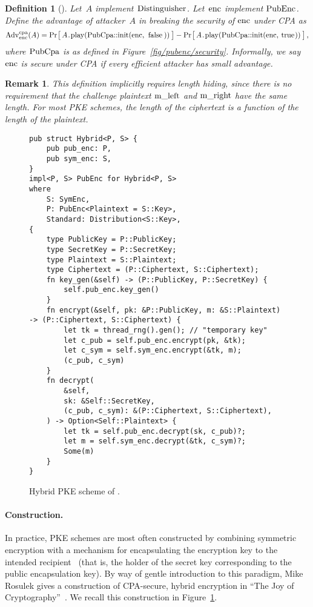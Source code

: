 \documentclass{article}
\newtheorem{definition}{Definition}
\newtheorem{remark}{Remark}
\newcommand{\Adv}[1]{\textrm{\textup{Adv}}^{\textup{#1}}}
\newcommand{\Prob}[1]{\Pr\hspace{-1pt}\big[\,#1\,\big]}
\newcommand{\code}[1]{\textrm{\textup{\lstinline{#1}}}}
\begin{document}
\begin{definition}[{\cite[Definition 15.1]{joy}}]
  Let~$A$ implement \hyperref[sec/traits]{$\code{Distinguisher}$}.
  Let~$\code{enc}$ implement \hyperref[fig/pubenc/syntax]{$\code{PubEnc}$}.
  Define the advantage of attacker~$A$ in breaking the security of
  $\code{enc}$ under CPA as
  \[
    \Adv{cpa}_{\code{enc}}(A) =
      \Prob{A\code{.play(PubCpa::init(enc, false))}} -
      \Prob{A\code{.play(PubCpa::init(enc, true))}} \,,
  \]
  where $\code{PubCpa}$ is as defined in Figure~\ref{fig/pubenc/security}.
  Informally, we say $\code{enc}$ is secure under CPA if every efficient
  attacker has small advantage.
\end{definition}

\begin{remark}
  This definition implicitly requires length hiding, since there is no
  requirement that the challenge plaintext $\code{m_left}$ and $\code{m_right}$
  have the same length. For most PKE schemes, the length of the ciphertext is a
  function of the length of the plaintext.
\end{remark}


\begin{figure}[t]
\begin{lstlisting}
pub struct Hybrid<P, S> {
    pub pub_enc: P,
    pub sym_enc: S,
}
impl<P, S> PubEnc for Hybrid<P, S>
where
    S: SymEnc,
    P: PubEnc<Plaintext = S::Key>,
    Standard: Distribution<S::Key>,
{
    type PublicKey = P::PublicKey;
    type SecretKey = P::SecretKey;
    type Plaintext = S::Plaintext;
    type Ciphertext = (P::Ciphertext, S::Ciphertext);
    fn key_gen(&self) -> (P::PublicKey, P::SecretKey) {
        self.pub_enc.key_gen()
    }
    fn encrypt(&self, pk: &P::PublicKey, m: &S::Plaintext) -> (P::Ciphertext, S::Ciphertext) {
        let tk = thread_rng().gen(); // "temporary key"
        let c_pub = self.pub_enc.encrypt(pk, &tk);
        let c_sym = self.sym_enc.encrypt(&tk, m);
        (c_pub, c_sym)
    }
    fn decrypt(
        &self,
        sk: &Self::SecretKey,
        (c_pub, c_sym): &(P::Ciphertext, S::Ciphertext),
    ) -> Option<Self::Plaintext> {
        let tk = self.pub_enc.decrypt(sk, c_pub)?;
        let m = self.sym_enc.decrypt(&tk, c_sym)?;
        Some(m)
    }
}
\end{lstlisting}
  \caption{Hybrid PKE scheme of \cite[Construction 15.8]{joy}.}
  \label{fig/hybrid}
\end{figure}


\paragraph{Construction.}
%
In practice, PKE schemes are most often constructed by combining symmetric
encryption with a mechanism for encapsulating the encryption key to the
intended recipient~\cite{rfc9180} (that is, the holder of the secret key
corresponding to the public encapsulation key).
%
By way of gentle introduction to this paradigm, Mike Rosulek gives a
construction of CPA-secure, hybrid encryption in ``The Joy of
Cryptography''~\cite{joy}.
%
We recall this construction in Figure~\ref{fig/hybrid}.
\end{document}
